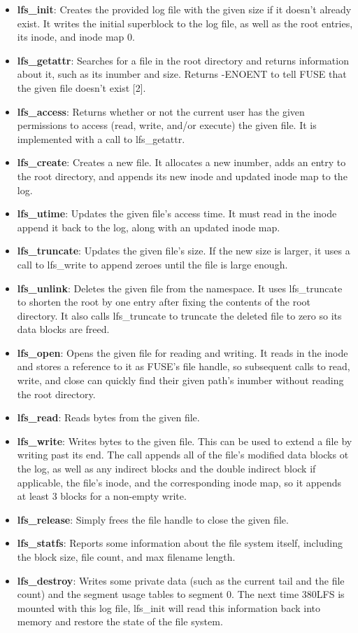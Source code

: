 \documentclass{article}
\begin{document}
\begin{itemize}
    \item \textbf{lfs\_init}: Creates the provided log file with the given size if it doesn't already exist. It writes the initial superblock to the log file, as well as the root entries, its inode, and inode map 0.
    \item \textbf{lfs\_getattr}: Searches for a file in the root directory and returns information about it, such as its inumber and size. Returns -ENOENT to tell FUSE that the given file doesn't exist [2].
    \item \textbf{lfs\_access}: Returns whether or not the current user has the given permissions to access (read, write, and/or execute) the given file. It is implemented with a call to lfs\_getattr.
    \item \textbf{lfs\_create}: Creates a new file. It allocates a new inumber, adds an entry to the root directory, and appends its new inode and updated inode map to the log.
    \item \textbf{lfs\_utime}: Updates the given file's access time. It must read in the inode append it back to the log, along with an updated inode map.
    \item \textbf{lfs\_truncate}: Updates the given file's size. If the new size is larger, it uses a call to lfs\_write to append zeroes until the file is large enough.
    \item \textbf{lfs\_unlink}: Deletes the given file from the namespace. It uses lfs\_truncate to shorten the root by one entry after fixing the contents of the root directory. It also calls lfs\_truncate to truncate the deleted file to zero so its data blocks are freed.
    \item \textbf{lfs\_open}: Opens the given file for reading and writing. It reads in the inode and stores a reference to it as FUSE's file handle, so subsequent calls to read, write, and close can quickly find their given path's inumber without reading the root directory.
    \item \textbf{lfs\_read}: Reads bytes from the given file.
    \item \textbf{lfs\_write}: Writes bytes to the given file. This can be used to extend a file by writing past its end. The call appends all of the file's modified data blocks ot the log, as well as any indirect blocks and the double indirect block if applicable, the file's inode, and the corresponding inode map, so it appends at least 3 blocks for a non-empty write.
    \item \textbf{lfs\_release}: Simply frees the file handle to close the given file.
    \item \textbf{lfs\_statfs}: Reports some information about the file system itself, including the block size, file count, and max filename length.
    \item \textbf{lfs\_destroy}: Writes some private data (such as the current tail and the file count) and the segment usage tables to segment 0. The next time 380LFS is mounted with this log file, lfs\_init will read this information back into memory and restore the state of the file system.
\end{itemize}
\end{document}
